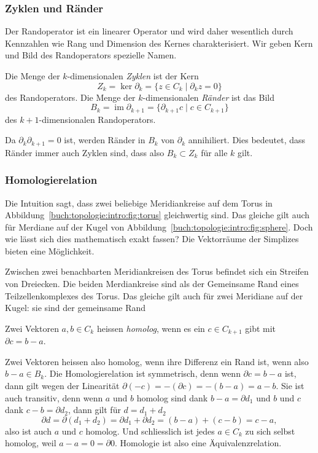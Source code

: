 %
%
\subsubsection{Zyklen und Ränder}
Der Randoperator ist ein linearer Operator und wird daher wesentlich
durch Kennzahlen wie Rang und Dimension des Kernes charakterisiert.
Wir geben Kern und Bild des Randoperators spezielle Namen.

\begin{definition}
Die Menge der $k$-dimensionalen {\em Zyklen} ist der Kern
%
\[
Z_k
=
\ker \partial_k 
=
\{ z\in C_k \mid \partial_kz = 0 \}
\]
des Randoperators.
Die Menge der $k$-dimensionalen {\em Ränder } ist das Bild
%
\[
B_k
=
\operatorname{im} \partial_{k+1}
=
\{ \partial_{k+1}c\mid c\in C_{k+1} \}
\]
des $k+1$-dimensionalen Randoperators.
\end{definition}

Da $\partial_{k}\partial_{k+1}=0$ ist, werden Ränder in $B_k$
von $\partial_k$ annihiliert.
Dies bedeutet, dass Ränder immer auch Zyklen sind, dass also
$B_k\subset Z_k$ für alle $k$ gilt.

%
%
\subsubsection{Homologierelation}
Die Intuition sagt, dass zwei beliebige Meridiankreise auf dem Torus in
Abbildung~\ref{buch:topologie:intro:fig:torus}
gleichwertig sind.
Das gleiche gilt auch für Merdiane auf der Kugel von
Abbildung~\ref{buch:topologie:intro:fig:sphere}.
Doch wie lässt sich dies mathematisch exakt fassen?
Die Vektorräume der Simplizes bieten eine Möglichkeit.

Zwischen zwei benachbarten Meridiankreisen des Torus befindet sich ein
Streifen von Dreiecken.
Die beiden Merdiankreise sind als der Gemeinsame Rand eines 
Teilzellenkomplexes des Torus.
Das gleiche gilt auch für zwei Meridiane auf der Kugel: sie sind
der gemeinsame Rand 

\begin{definition}[homolog]
Zwei Vektoren $a,b\in C_k$ heissen \emph{homolog}, 
wenn es ein $c\in C_{k+1}$ gibt mit $\partial c=b-a$.
\end{definition}

Zwei Vektoren heissen also homolog, wenn ihre Differenz ein Rand ist,
wenn also $b-a\in B_k$.
Die Homologierelation ist symmetrisch, denn wenn $\partial c=b-a$ ist,
dann gilt wegen der Linearität $\partial (-c) = -(\partial c)=-(b-a)=a-b$.
Sie ist auch transitiv, denn wenn $a$ und $b$ homolog sind dank
$b-a=\partial d_1$ und $b$ und $c$ dank $c-b=\partial d_2$, dann gilt
für $d=d_1+d_2$
\[
\partial d
=
\partial(d_1+d_2)
=
\partial d_1
+
\partial d_2
=
(b-a)+(c-b)
=
c-a,
\]
also ist auch $a$ und $c$ homolog.
Und schliesslich ist jedes $a\in C_k$ zu sich selbst homolog,
weil $a-a=0=\partial 0$.
Homologie ist also eine Äquivalenzrelation.


